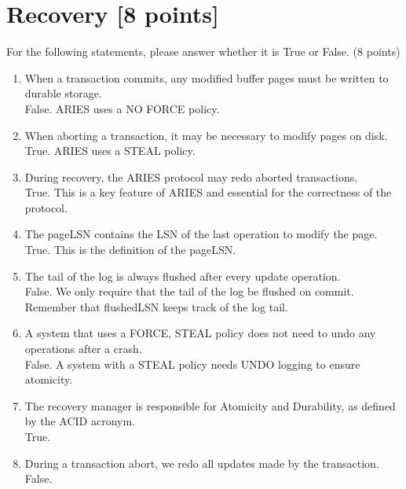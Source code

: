 \documentclass[10pt]{article}
\begin{document}

\section{ \textbf{Recovery [8 points]}}
 For the following statements, please answer whether it is True or False. (8 points)

\begin{enumerate}
    \item When a transaction commits, any modified buffer pages must be written to durable storage.
    \\
    {\color{red}False. ARIES uses a NO FORCE policy.}
    \item When aborting a transaction, it may be necessary to modify pages on disk.
    \\
    {\color{red}True. ARIES uses a STEAL policy.}
    \item During recovery, the ARIES protocol may redo aborted transactions.
    \\
    {\color{red}True. This is a key feature of ARIES and essential for the correctness of the protocol.}
    \item The pageLSN contains the LSN of the last operation to modify the page.
    \\
    {\color{red}True. This is the definition of the pageLSN.}
    \item The tail of the log is always flushed after every update operation.
    \\
    {\color{red}False. We only require that the tail of the log be flushed on commit. Remember that flushedLSN keeps
track of the log tail.}
    \item A system that uses a FORCE, STEAL policy does not need to undo any operations after a crash.
    \\
    {\color{red}False. A system with a STEAL policy needs UNDO logging to ensure atomicity.}
    \item The recovery manager is responsible for Atomicity and Durability, as defined by the ACID acronym.
    \\
    {\color{red}True.}
    \item During a transaction abort, we redo all updates made by the transaction.
    \\
    {\color{red}False.}
\end{enumerate}
\end{document}
